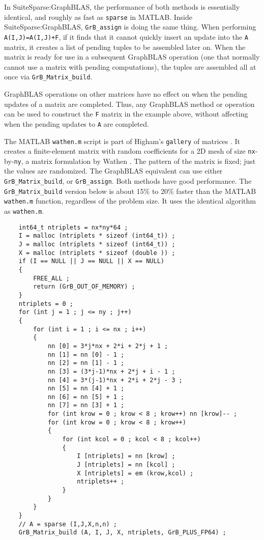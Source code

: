 \documentclass[12pt]{article}
\begin{document}
In SuiteSparse:GraphBLAS, the performance of both methods is essentially
identical, and roughly as fast as \verb'sparse' in MATLAB.  Inside
SuiteSparse:GraphBLAS, \verb'GrB_assign' is doing the same thing. When
performing \verb'A(I,J)=A(I,J)+F', if it finds that it cannot quickly insert an
update into the \verb'A' matrix, it creates a list of pending tuples to be
assembled later on.   When the matrix is ready for use in a subsequent
GraphBLAS operation (one that normally cannot use a matrix with pending
computations), the tuples are assembled all at once via
\verb'GrB_Matrix_build'.

GraphBLAS operations on other matrices have no effect on when the pending
updates of a matrix are completed.  Thus, any GraphBLAS method or operation can
be used to construct the \verb'F' matrix in the example above, without
affecting when the pending updates to \verb'A' are completed.

The MATLAB \verb'wathen.m' script is part of Higham's \verb'gallery' of
matrices \cite{Higham}.  It creates a finite-element matrix with random
coefficients for a 2D mesh of size \verb'nx'-by-\verb'ny', a matrix formulation
by Wathen \cite{Wathen}.  The pattern of the matrix is fixed; just the values
are randomized.  The GraphBLAS equivalent can use either
\verb'GrB_Matrix_build', or \verb'GrB_assign'.  Both methods have good
performance.  The \verb'GrB_Matrix_build' version below is about 15\% to 20\%
faster than the MATLAB \verb'wathen.m' function, regardless of the problem
size.  It uses the identical algorithm as \verb'wathen.m'.

    {\footnotesize
    \begin{verbatim}
    int64_t ntriplets = nx*ny*64 ;
    I = malloc (ntriplets * sizeof (int64_t)) ;
    J = malloc (ntriplets * sizeof (int64_t)) ;
    X = malloc (ntriplets * sizeof (double )) ;
    if (I == NULL || J == NULL || X == NULL)
    {
        FREE_ALL ;
        return (GrB_OUT_OF_MEMORY) ;
    }
    ntriplets = 0 ;
    for (int j = 1 ; j <= ny ; j++)
    {
        for (int i = 1 ; i <= nx ; i++)
        {
            nn [0] = 3*j*nx + 2*i + 2*j + 1 ;
            nn [1] = nn [0] - 1 ;
            nn [2] = nn [1] - 1 ;
            nn [3] = (3*j-1)*nx + 2*j + i - 1 ;
            nn [4] = 3*(j-1)*nx + 2*i + 2*j - 3 ;
            nn [5] = nn [4] + 1 ;
            nn [6] = nn [5] + 1 ;
            nn [7] = nn [3] + 1 ;
            for (int krow = 0 ; krow < 8 ; krow++) nn [krow]-- ;
            for (int krow = 0 ; krow < 8 ; krow++)
            {
                for (int kcol = 0 ; kcol < 8 ; kcol++)
                {
                    I [ntriplets] = nn [krow] ;
                    J [ntriplets] = nn [kcol] ;
                    X [ntriplets] = em (krow,kcol) ;
                    ntriplets++ ;
                }
            }
        }
    }
    // A = sparse (I,J,X,n,n) ;
    GrB_Matrix_build (A, I, J, X, ntriplets, GrB_PLUS_FP64) ; \end{verbatim}}
\end{document}
